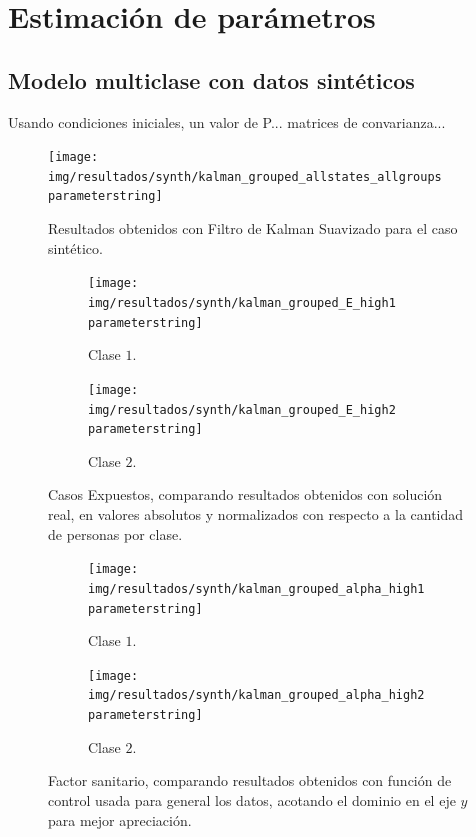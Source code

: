 \section{Estimación de parámetros}

\subsection{Modelo multiclase con datos sintéticos}

Usando condiciones iniciales, un valor de P... matrices de convarianza... 

\begin{figure}[h]
\centering
\texttt{[image: img/resultados/synth/kalman\_grouped\_allstates\_allgroups\\parameterstring]}
\caption{Resultados obtenidos con Filtro de Kalman Suavizado para el caso sintético.}
\label{synth-all-nohigh}
\end{figure}



\begin{figure}
     \centering
     \begin{subfigure}[b]{\textwidth}
         \centering
         \texttt{[image: img/resultados/synth/kalman\_grouped\_E\_high1\\parameterstring]}
         \caption{Clase \(1\).}
     \end{subfigure}
     \hfill
     \begin{subfigure}[b]{\textwidth}
         \centering
         \texttt{[image: img/resultados/synth/kalman\_grouped\_E\_high2\\parameterstring]}
         \caption{Clase \(2\).}
     \end{subfigure}
        \caption{Casos Expuestos, comparando resultados obtenidos con solución real, en valores absolutos y normalizados con respecto a la cantidad de personas por clase.}
        \label{synth-e-comp-high}
\end{figure}

\begin{figure}
     \centering
     \begin{subfigure}[b]{\textwidth}
         \centering
         \texttt{[image: img/resultados/synth/kalman\_grouped\_alpha\_high1\\parameterstring]}
         \caption{Clase \(1\).}
     \end{subfigure}
     \hfill
     \begin{subfigure}[b]{\textwidth}
         \centering
         \texttt{[image: img/resultados/synth/kalman\_grouped\_alpha\_high2\\parameterstring]}
         \caption{Clase \(2\).}
     \end{subfigure}
        \caption[Factor sanitario, caso sintético]{Factor sanitario, comparando resultados obtenidos con función de control usada para general los datos, acotando el dominio en el eje \(y\) para mejor apreciación.}
        \label{synth-alpha-comp-high}
\end{figure}


